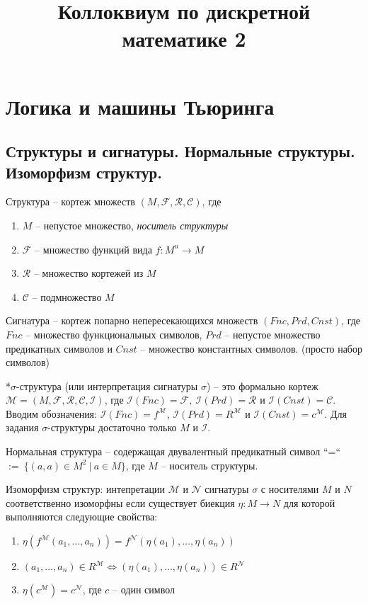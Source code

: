 \documentclass[a4paper, 10pt]{article}
\title{Коллоквиум по дискретной математике 2}
\date{}
\newcommand{\FF}{\mathcal{F}}
\newcommand{\RR}{\mathcal{R}}
\newcommand{\CC}{\mathcal{C}}
\newcommand{\MM}{\mathcal{M}}
\newcommand{\II}{\mathcal{I}}
\newcommand{\NN}{\mathcal{N}}
\begin{document}
\maketitle

\tableofcontents

\newpage

\section{Логика и машины Тьюринга}

\subsection{Структуры и сигнатуры. Нормальные структуры. Изоморфизм структур.}

Структура -- кортеж множеств $(M, \FF, \RR, \CC)$, где 
\begin{enumerate}
    \item $M$ -- непустое множество, \textit{носитель структуры}
    \item $\FF$ -- множество функций вида $f\colon M^n\to M$
    \item $\RR$ -- множество кортежей из $M$
    \item $\CC$ -- подмножество $M$
\end{enumerate}

Сигнатура -- кортеж попарно непересекающихся множеств $(Fnc,Prd,Cnst)$, где $Fnc$ -- множество функциональных символов, $Prd$ -- непустое множество предикатных символов и $Cnst$ -- множество константных символов. (просто набор символов)

*$\sigma$-структура (или интерпретация сигнатуры $\sigma$) -- это формально кортеж $\MM = (M,\FF,\RR,\CC,\II)$, где $\II(Fnc)=\FF,~\II(Prd)=\RR$ и $\II(Cnst)=\CC$. Вводим обозначения: $\II(Fnc)=f^\MM$, $\II(Prd)=R^\MM$ и $\II(Cnst)=c^\MM$. Для задания $\sigma$-структуры достаточно только $M$ и $\II$.

Нормальная структура -- содержащая двувалентный предикатный символ ``=`` $:=~\{(a, a) \in M^2~|~a \in M\}$, где $M$ -- носитель структуры.


Изоморфизм структур: интепретации $\MM$ и $\NN$ сигнатуры $\sigma$ с носителями $M$ и $N$ соответственно изоморфны если существует биекция $\eta \colon M \to N$ для которой выполняются следующие свойства:
\begin{enumerate}
    \item $\eta(f^\MM(a_1,\ldots,a_n))=f^\NN(\eta(a_1),\ldots,\eta(a_n))$
    \item $(a_1,\ldots,a_n)\in R^\MM \iff (\eta(a_1),\ldots,\eta(a_n))\in R^\NN$
    \item $\eta(c^\MM) = c^\NN$, где $c$ -- один символ
\end{enumerate}
\end{document}

